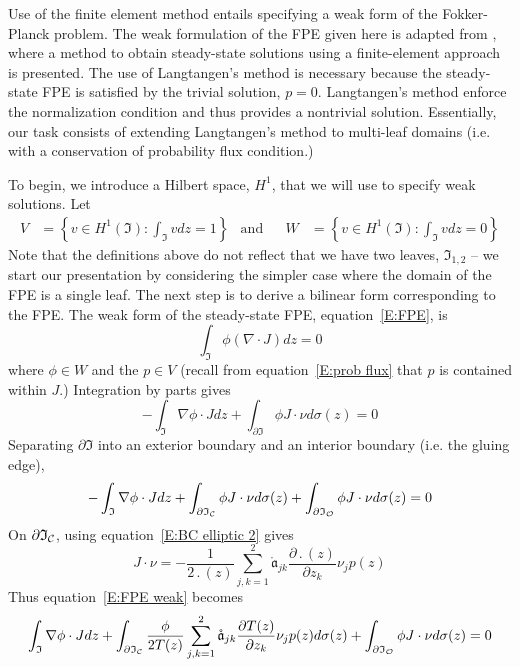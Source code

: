 Use of the finite element method entails specifying a weak form of the Fokker-Planck problem. The weak formulation of the FPE given here is adapted from \citet{langtangen91:_fokker_planck}, where a method to obtain steady-state solutions using a finite-element approach is presented. The use of Langtangen's method is necessary because the steady-state FPE is satisfied by the trivial solution, $p=0$. Langtangen's method enforce the normalization condition and thus provides a nontrivial solution.
Essentially, our task consists of extending Langtangen's method to multi-leaf domains (i.e. with a conservation of probability flux condition.)

To begin, we introduce a Hilbert space, $H^1$, that we will use to specify weak solutions. Let
\begin{align}
V &= \left\{v \in H^1(\mathfrak I): \int_\mathfrak I v dz = 1\right\} &\text{and}&& W &= \left\{v \in H^1(\mathfrak I): \int_\mathfrak I v dz = 0\right\}
\label{E:weak spaces}
\end{align}
Note that the definitions above do not reflect that we have two leaves, $\mathfrak{I}_{1,2}$ -- we start our presentation by considering the simpler case where the domain of the FPE is a single leaf. The next step is to derive a bilinear form corresponding to the FPE. The weak form of the steady-state FPE, equation~\eqref{E:FPE}, is
\[
\int_\mathfrak I \phi (\nabla \cdot J) dz = 0
\]
where $\phi \in W$ and the $p \in V$ (recall from equation~\eqref{E:prob flux} that $p$ is contained within $J$.) Integration by parts gives
\[
-\int_\mathfrak I \nabla \phi \cdot J dz + \int_{\partial \mathfrak I} \phi J \cdot \nu d\sigma(z) = 0
\]
Separating $\partial \mathfrak I$ into an exterior boundary and an interior boundary (i.e. the gluing edge),
\begin{equation}
-\int_\mathfrak I \nabla \phi \cdot J dz + \int_{\partial \mathfrak I_\mathcal C} \phi J \cdot \nu d\sigma(z) + \int_{\partial \mathfrak I_\mathcal{O}} \phi J \cdot \nu d\sigma(z) = 0
\label{E:FPE weak}
\end{equation}
On $\partial \mathfrak I_\mathcal C$, using equation~\eqref{E:BC elliptic 2} gives
\[
J \cdot \nu = -\frac{1}{2 \period(z)} \sum_{j,k=1}^2 \mathring{\mathfrak{a}}_{jk} \frac{\partial \period(z)}{\partial z_k} \nu_j p(z)
\]
Thus equation~\eqref{E:FPE weak} becomes
\begin{equation}
\int_\mathfrak I \nabla \phi \cdot J dz + \int_{\partial \mathfrak I_\mathcal C} \frac{\phi}{2 T(z)} \sum_{j,k=1}^2 \mathring{\mathfrak{a}}_{jk} \frac{\partial T(z)}{\partial z_k} \nu_j p(z) d\sigma(z) + \int_{\partial \mathfrak I_\mathcal{O}} \phi J \cdot \nu d\sigma(z) = 0
\label{E:FPE weak 2}
\end{equation}

